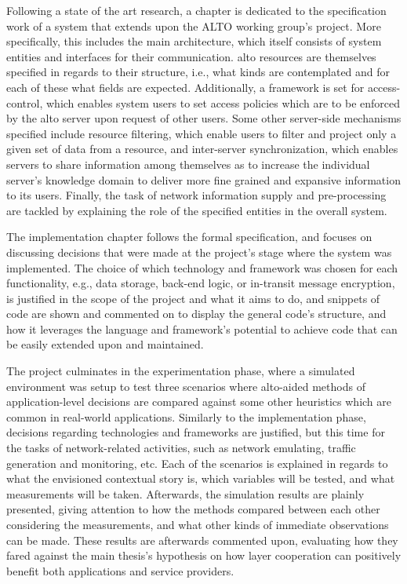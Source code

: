     Following a state of the art research, a chapter is dedicated to the specification work of a system that extends upon the ALTO working group's project.
    More specifically, this includes the main architecture, which itself consists of system entities and interfaces for their communication. \gls{alto} resources are themselves specified in regards to their structure, i.e., what kinds are contemplated and for each of these what fields are expected. 
    Additionally, a framework is set for access-control, which enables system
    users to set access policies which are to be enforced by the \gls{alto} server upon request of other users.
    Some other server-side mechanisms specified include resource filtering, which enable users to filter and project only a given set of data from a resource,
and inter-server synchronization, which enables servers to share information among themselves as to increase the individual server's knowledge domain to deliver more fine grained and expansive information to its users.
    Finally, the task of network information supply and pre-processing are tackled by explaining the role of the specified entities in the overall system.

    The implementation chapter follows the formal specification, and focuses on discussing decisions that were made at the project's stage where the system was implemented. 
    The choice of which technology and framework was chosen for each functionality, e.g., data storage, back-end logic, or in-transit message encryption, is justified in the scope of the project and what it aims to do, and snippets of code are shown and commented on to display the general code's structure, and how it leverages the language and framework's potential to achieve code that can be easily extended upon and maintained.
    
    The project culminates in the experimentation phase, where a simulated environment was setup to test three scenarios where \gls{alto}-aided methods of application-level decisions are compared against some other heuristics which are common in real-world applications.
    Similarly to the implementation phase, decisions regarding technologies and frameworks are justified, but this time for the tasks of network-related activities, such as network emulating, traffic generation and monitoring, etc. 
    Each of the scenarios is explained in regards to what the envisioned contextual story is, which variables will be tested, and what measurements will be taken. 
    Afterwards, the simulation results are plainly presented, giving attention to how the methods compared between each other considering the measurements, and what other kinds of immediate observations can be made. 
    These results are afterwards commented upon, evaluating how they fared against the main thesis's hypothesis on how layer cooperation can positively benefit both applications and service providers.

